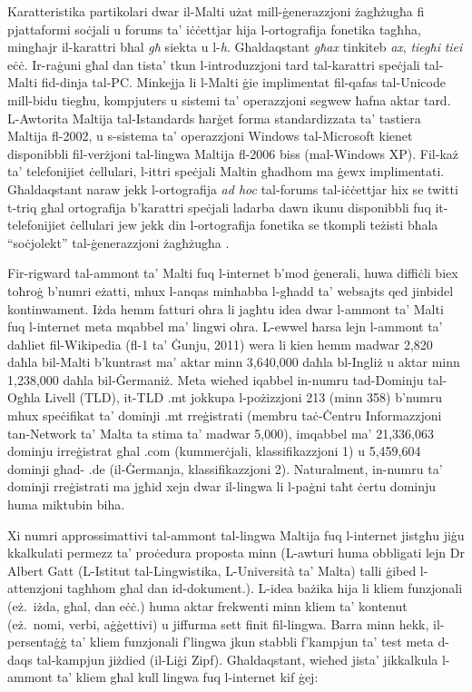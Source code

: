 \begin{multicols}{2}
Karatteristika partikolari dwar il-Malti użat mill-ġenerazzjoni żagħżugħa fi pjattaformi soċjali u forums ta’ iċċettjar hija l-ortografija fonetika tagħha, mingħajr il-karattri bħal \emph{għ} siekta u l-\emph{h}. Għaldaqstant \emph{għax} tinkiteb \emph{ax}, \emph{tiegħi} \emph{tiei} eċċ. Ir-raġuni għal dan tista’ tkun l-introduzzjoni tard tal-karattri speċjali tal-Malti fid-dinja tal-PC. Minkejja li l-Malti ġie implimentat fil-qafas tal-Unicode mill-bidu tiegħu, kompjuters u sistemi ta’ operazzjoni segwew ħafna aktar tard. L-Awtorita Maltija tal-Istandards ħarġet forma standardizzata ta’ tastiera Maltija fl-2002, u s-sistema ta’ operazzjoni Windows tal-Microsoft kienet disponibbli fil-verżjoni tal-lingwa Maltija fl-2006 biss (mal-Windows XP). Fil-każ ta’ telefonijiet ċellulari, l-ittri speċjali Maltin għadhom ma ġewx implimentati. Għaldaqstant naraw jekk l-ortografija \emph{ad hoc} tal-forums tal-iċċettjar hix se twitti t-triq għal ortografija b’karattri speċjali ladarba dawn ikunu disponibbli fuq it-telefonijiet ċellulari jew jekk din l-ortografija fonetika se tkompli teżisti bħala ``soċjolekt'' tal-ġenerazzjoni żagħżugħa \cite{Fabri:2011b}.
    
Fir-rigward tal-ammont ta’ Malti fuq l-internet b’mod ġenerali, huwa diffiċli biex toħroġ b’numri eżatti, mhux l-anqas minħabba l-għadd ta’ websajts qed jinbidel kontinwament. Iżda hemm fatturi oħra li jagħtu idea dwar l-ammont ta’ Malti fuq l-internet meta mqabbel ma’ lingwi oħra.
L-ewwel ħarsa lejn l-ammont ta’ daħliet fil-Wikipedia (fl-1 ta’ Ġunju, 2011) wera li kien hemm madwar 2,820 daħla bil-Malti b’kuntrast ma’ aktar minn 3,640,000 daħla bl-Ingliż u aktar minn 1,238,000 daħla bil-Ġermaniż.
Meta wieħed iqabbel in-numru tad-Dominju tal-Ogħla Livell (TLD), it-TLD .mt jokkupa l-pożizzjoni 213 (minn 358) b’numru mhux speċifikat ta’ dominji .mt rreġistrati (membru taċ-Ċentru Informazzjoni tan-Network ta' Malta ta stima ta’ madwar 5,000), imqabbel ma’ 21,336,063 dominju irreġistrat għal .com (kummerċjali, klassifikazzjoni 1) u 5,459,604 dominji għad- .de (il-Ġermanja, klassifikazzjoni 2). Naturalment, in-numru ta’ dominji rreġistrati ma jgħid xejn dwar il-lingwa li l-paġni taħt ċertu dominju huma miktubin biha. 
    
Xi numri approssimattivi tal-ammont tal-lingwa Maltija fuq l-internet jistgħu jiġu kkalkulati permezz ta’ proċedura proposta minn \cite{Kilgarriff-Grefenstette:2003} (L-awturi huma obbligati lejn Dr Albert Gatt (L-Istitut tal-Lingwistika, L-Università ta' Malta) talli ġibed l-attenzjoni tagħhom għal dan id-dokument.). L-idea bażika hija li kliem funzjonali (eż.~iżda, għal, dan eċċ.) huma aktar frekwenti minn kliem ta’ kontenut (eż.~nomi, verbi, aġġettivi) u jiffurma sett finit fil-lingwa. Barra minn hekk, il-persentaġġ ta’ kliem funzjonali f'lingwa jkun stabbli f'kampjun ta’ test meta d-daqs tal-kampjun jiżdied (il-Liġi Zipf). Għaldaqstant, wieħed jista’ jikkalkula l-ammont ta’ kliem għal kull lingwa fuq l-internet kif ġej:


\end{multicols}
